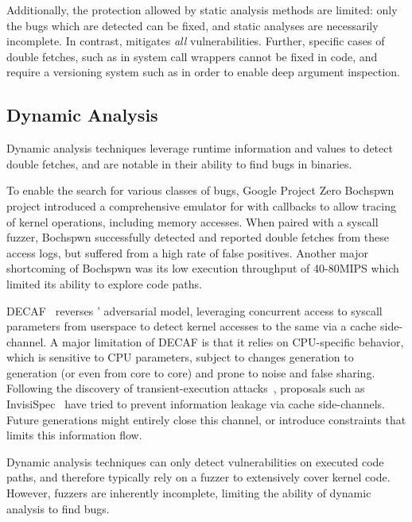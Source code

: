\documentclass[letterpaper,twocolumn,10pt]{article}
\begin{document}
Additionally, the protection allowed by static analysis methods are 
limited: only the bugs which are detected can be fixed, and static 
analyses are necessarily incomplete.
In contrast, \midas mitigates \emph{all} \tocttou vulnerabilities.
Further, specific cases of double fetches, such as in system call wrappers
cannot be fixed in code, and require a versioning system such as 
\midas in order to enable deep argument inspection.

\subsection{Dynamic Analysis}

Dynamic analysis techniques leverage runtime information and values 
to detect double fetches, and are notable in their ability to 
find bugs in binaries.

To enable the search for various classes of bugs, Google Project Zero 
Bochspwn~\cite{jurczyk2013bochspwn} project introduced
a comprehensive emulator for  with callbacks to allow 
tracing of kernel operations, including memory accesses.
When paired with a syscall fuzzer, 
Bochspwn successfully detected and reported double fetches from
these access logs, but suffered from a high rate of false positives.
Another major shortcoming of Bochspwn was its low execution throughput
of 40-80MIPS which limited its ability to explore code paths.

DECAF~\cite{schwartzDECAF} reverses \midas' adversarial model, leveraging 
concurrent access to syscall parameters from userspace to detect kernel 
accesses to the same via a cache side-channel.
A major limitation of DECAF is that it relies on CPU-specific behavior, which 
is sensitive to CPU parameters, subject to changes generation to 
generation (or even from core to core) and prone to noise and false sharing. 
Following the discovery of transient-execution attacks~\cite{kocher18spectre},
proposals such as InvisiSpec~\cite{YanInvisispec,KhasawnehKSEPA19} have 
tried to prevent 
information leakage via cache side-channels.
Future generations might entirely close this channel, or introduce constraints 
that limits this information flow. 

Dynamic analysis techniques can only detect vulnerabilities on executed code 
paths, and therefore typically rely on a fuzzer to extensively cover kernel code.
However, fuzzers are inherently incomplete, limiting the ability of dynamic 
analysis to find bugs.
\end{document}
